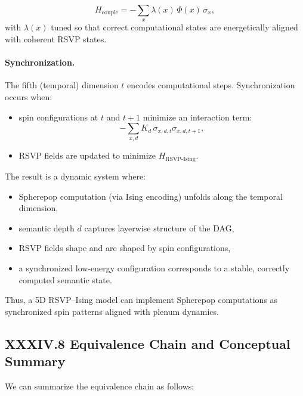 \documentclass[11pt,letterpaper]{article}
\begin{document}
\[
H_{\text{couple}} = -\sum_x \lambda(x)\, \Phi(x)\, \sigma_x,
\]
with $\lambda(x)$ tuned so that correct computational states are energetically aligned with coherent RSVP states.

\paragraph{Synchronization.}
The fifth (temporal) dimension $t$ encodes computational steps. Synchronization occurs when:

\begin{itemize}
  \item spin configurations at $t$ and $t+1$ minimize an interaction term:
  \[
  -\sum_{x,d} K_{d}\, \sigma_{x,d,t} \sigma_{x,d,t+1},
  \]
  \item RSVP fields are updated to minimize $H_{\text{RSVP-Ising}}$.
\end{itemize}

The result is a dynamic system where:

\begin{itemize}
  \item Spherepop computation (via Ising encoding) unfolds along the temporal dimension,
  \item semantic depth $d$ captures layerwise structure of the DAG,
  \item RSVP fields shape and are shaped by spin configurations,
  \item a synchronized low-energy configuration corresponds to a stable, correctly computed semantic state.
\end{itemize}

Thus, a 5D RSVP--Ising model can implement Spherepop computations as synchronized spin patterns aligned with plenum dynamics.

\subsection{XXXIV.8 Equivalence Chain and Conceptual Summary}

We can summarize the equivalence chain as follows:
\end{document}
